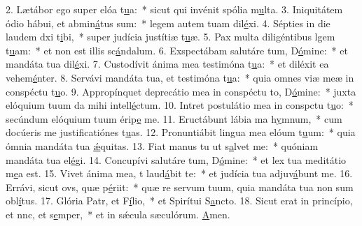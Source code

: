 2. Lætábor ego super elóa t\uline{u}a:~* sicut qui invénit spólia m\uline{u}lta.
3. Iniquitátem ódio hábui, et abmin\uline{á}tus sum:~* legem autem tuam dil\uline{é}xi.
4. Sépties in die laudem dxi t\uline{i}bi,~* super judícia justítiæ t\uline{u}æ.
5. Pax multa diligéntibus lgem t\uline{u}am:~* et non est illis sc\uline{á}ndalum.
6. Exspectábam salutáre tum, D\uline{ó}mine:~* et mandáta tua dil\uline{é}xi.
7. Custodívit ánima mea testimóna t\uline{u}a:~* et diléxit ea vehem\uline{é}nter.
8. Servávi mandáta tua, et testimóna t\uline{u}a:~* quia omnes viæ meæ in conspéctu t\uline{u}o.
9. Appropínquet deprecátio mea in conspéctu to, D\uline{ó}mine:~* juxta elóquium tuum da mihi intell\uline{é}ctum.
10. Intret postulátio mea in conspctu t\uline{u}o:~* secúndum elóquium tuum érip\uline{e} me.
11. Eructábunt lábia ma h\uline{y}mnum,~* cum docúeris me justificatiónes t\uline{u}as.
12. Pronuntiábit lingua mea elóum t\uline{u}um:~* quia ómnia mandáta tua \uline{ǽ}quitas.
13. Fiat manus tu ut s\uline{a}lvet me:~* quóniam mandáta tua el\uline{é}gi.
14. Concupívi salutáre tum, D\uline{ó}mine:~* et lex tua meditátio m\uline{e}a est.
15. Vivet ánima mea, t laud\uline{á}bit te:~* et judícia tua adjuv\uline{á}bunt me.
16. Errávi, sicut ovs, quæ p\uline{é}riit:~* quæ re servum tuum, quia mandáta tua non sum obl\uline{í}tus.
17. Glória Patr, et F\uline{í}lio,~* et Spirítui S\uline{a}ncto.
18. Sicut erat in princípio, et nnc, et s\uline{e}mper,~* et in sǽcula sæculórum. \uline{A}men.
